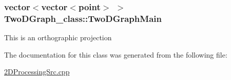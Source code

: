 \subsubsection[{\texorpdfstring{Two\+D\+Graph\+Main}{TwoDGraphMain}}]{\setlength{\rightskip}{0pt plus 5cm}vector$<$vector$<${\bf point}$>$ $>$ Two\+D\+Graph\+\_\+class\+::\+Two\+D\+Graph\+Main\hspace{0.3cm}{\ttfamily [static]}}\hypertarget{classTwoDGraph__class_a973baa8979a298061224d1b949381a58}{}\label{classTwoDGraph__class_a973baa8979a298061224d1b949381a58}
This is an orthographic projection 

The documentation for this class was generated from the following file\+:\begin{DoxyCompactItemize}
\item 
\hyperlink{2DProcessingSrc_8cpp}{2\+D\+Processing\+Src.\+cpp}\end{DoxyCompactItemize}
